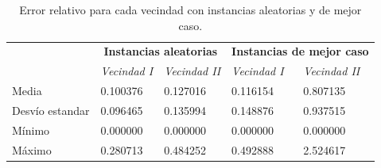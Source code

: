 \begin{table}[H]
    \begin{center}
        \begin{tabular}{ | l | l | l | l | l | }
            \hline
            \multicolumn{1}{|c|}{}&
            \multicolumn{2}{|c|}{\textbf{Instancias aleatorias}}&
            \multicolumn{2}{|c|}{\textbf{Instancias de mejor caso}}\\
            \cline{2-5}
                        &    \textit{Vecindad I}     &    \textit{Vecindad II}    &    \textit{Vecindad I}     &    \textit{Vecindad II}    \\ \hline
            Media       &   0.100376    &   0.127016    &   0.116154    &   0.807135    \\ \hline
            Desv\'io estandar       &   0.096465    &   0.135994    &   0.148876    &   0.937515    \\ \hline
            M\'inimo    &   0.000000    &   0.000000    &   0.000000    &   0.000000    \\ \hline
            M\'aximo    &   0.280713    &   0.484252    &   0.492888    &   2.524617    \\ \hline
        \end{tabular}
    \end{center}
    \caption{Error relativo para cada vecindad con instancias aleatorias y de mejor caso.}    
    \label{table:error_relativo}
\end{table}